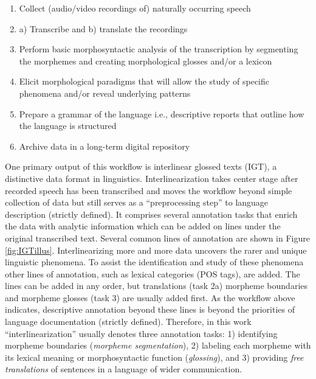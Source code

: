 \begin{enumerate}
    \item Collect (audio/video recordings of) naturally occurring speech
    \item a) Transcribe and b) translate the recordings
    \item Perform basic morphosyntactic analysis of the transcription by segmenting the morphemes and creating morphological glosses and/or a lexicon
    \item Elicit morphological paradigms that will allow the study of specific phenomena and/or reveal underlying patterns
    \item Prepare a grammar of the language i.e., descriptive reports that outline how the language is structured
    \item Archive data in a long-term digital repository
\end{enumerate}

One primary output of this workflow is interlinear glossed texts (IGT), a distinctive data format in linguistics. 
Interlinearization takes center stage after recorded speech has been transcribed and moves the workflow beyond simple collection of data but still serves as a ``preprocessing step'' to \citep{moon_unsupervised_2009} language description (strictly defined). It comprises several annotation tasks that enrich the data with analytic information which can be added on lines under the original transcribed text. Several common lines of annotation are shown in Figure \ref{fig:IGTillus}. Interlinearizing more and more data uncovers the rarer and unique linguistic phenomena. To assist the identification and study of these phenomena other lines of annotation, such as lexical categories (POS tags), are added. The lines can be added in any order, but translations (task 2a) morpheme boundaries and morpheme glosses (task 3) are usually added first. As the workflow above indicates, descriptive annotation beyond these lines is beyond the priorities of language documentation (strictly defined). Therefore, in this work ``interlinearization'' usually denotes three annotation tasks: 1) identifying morpheme boundaries (\emph{morpheme segmentation}), 2) labeling each morpheme with its lexical meaning or morphosyntactic function (\emph{glossing}), and 3) providing \emph{free translations} of sentences in a language of wider communication.  



